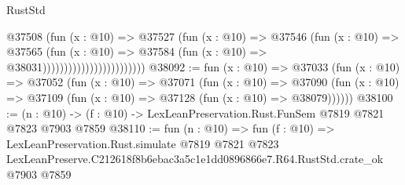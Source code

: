 \begin{lexlean}{RustStd}
\begin{coremodule}
                                        @37508
                                          (fun (x : @10) =>
                                          @37527
                                            (fun (x : @10) =>
                                            @37546
                                              (fun (x : @10) =>
                                              @37565
                                                (fun (x : @10) =>
                                                @37584
                                                  (fun (x : @10) => @38031))))))))))))))))))))))))
@38092 := fun (x : @10) =>
  @37033
    (fun (x : @10) =>
    @37052
      (fun (x : @10) =>
      @37071
        (fun (x : @10) =>
        @37090 (fun (x : @10) => @37109 (fun (x : @10) => @37128 (fun (x : @10) => @38079))))))
@38100 := (n : @10) -> (f : @10) -> LexLeanPreservation.Rust.FunSem @7819 @7821 @7823 @7903 @7859
@38110 := fun (n : @10) =>
  fun (f : @10) =>
  LexLeanPreservation.Rust.simulate
    @7819
    @7821
    @7823
    LexLeanPreserve.C212618f8b6ebac3a5c1e1dd0896866e7.R64.RustStd.crate_ok
    @7903
    @7859
\end{coremodule}
\end{lexlean}
